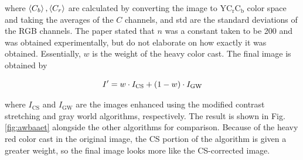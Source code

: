 \documentclass[12pt,a4paper]{article}
\begin{document}
\noindent
where $\ev{C_b}, \ev{C_r}$ are calculated by converting the image to $\mathrm{YC_rC_b}$ color space and taking the averages of the $C$ channels, and std are the standard deviations of the RGB channels. The paper stated that $n$ was a constant taken to be 200 and was obtained experimentally, but do not elaborate on how exactly it was obtained. Essentially, $w$ is the weight of the heavy color cast. The final image is obtained by

\begin{equation}\label{eq:awbaaet}
	I^\prime = w \cdot I_\mathrm{CS} + \qty(1-w) \cdot I_\mathrm{GW}
\end{equation}

\noindent
where $I_\mathrm{CS}$ and $I_\mathrm{GW}$ are the images enhanced using the modified contrast stretching and gray world algorithms, respectively. The result is shown in Fig. \ref{fig:awbaaet} alongside the other algorithms for comparison. Because of the heavy red color cast in the original image, the CS portion of the algorithm is given a greater weight, so the final image looks more like the CS-corrected image.
\end{document}
